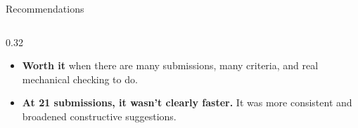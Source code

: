 \documentclass[aspectratio=169, 10pt]{beamer}
\begin{document}
\begin{frame}{Recommendations}
\begin{columns}[T]
\begin{column}{0.32\textwidth}
\begin{tcolorbox}[keybox, title={\faBalanceScale\quad When it's worth it}, top=2pt, bottom=2pt]
\scriptsize
\begin{itemize}\setlength{\itemsep}{3pt}
  \item \textbf{Worth it} when there are many submissions, many criteria, and real mechanical checking to do.
  \item \textbf{At 21 submissions, it wasn't clearly faster.} It was more consistent and broadened constructive suggestions. 
\end{itemize}
\end{tcolorbox}
\end{column}
\end{columns}
\vskip3pt
\end{frame}
\end{document}
